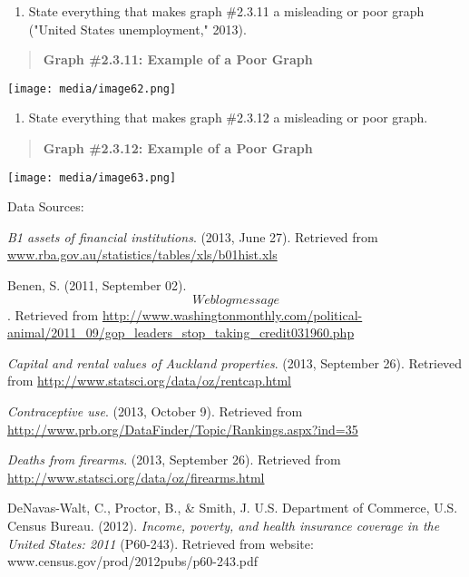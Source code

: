 \documentclass[]{book}
\providecommand{\tightlist}{%
  \setlength{\itemsep}{0pt}\setlength{\parskip}{0pt}}
\begin{document}
\begin{enumerate}
\def\labelenumi{\arabic{enumi}.}
\setcounter{enumi}{12}
\tightlist
\item
  State everything that makes graph \#2.3.11 a misleading or poor
  graph ("United States unemployment," 2013).
\end{enumerate}

\begin{quote}
\textbf{Graph \#2.3.11: Example of a Poor Graph}
\end{quote}

\texttt{[image: media/image62.png]}

\begin{enumerate}
\def\labelenumi{\arabic{enumi}.}
\setcounter{enumi}{13}
\tightlist
\item
  State everything that makes graph \#2.3.12 a misleading or poor
  graph.
\end{enumerate}

\begin{quote}
\textbf{Graph \#2.3.12: Example of a Poor Graph}
\end{quote}

\texttt{[image: media/image63.png]}

Data Sources:

\emph{B1 assets of financial institutions}. (2013, June 27). Retrieved from
\href{http://www.rba.gov.au/statistics/tables/xls/b01hist.xls}{www.rba.gov.au/statistics/tables/xls/b01hist.xls}

Benen, S. (2011, September 02). \[Web log message\]. Retrieved from
\url{http://www.washingtonmonthly.com/political-animal/2011_09/gop_leaders_stop_taking_credit031960.php}

\emph{Capital and rental values of Auckland properties}. (2013, September
26). Retrieved from \url{http://www.statsci.org/data/oz/rentcap.html}

\emph{Contraceptive use}. (2013, October 9). Retrieved from
\url{http://www.prb.org/DataFinder/Topic/Rankings.aspx?ind=35}

\emph{Deaths from firearms}. (2013, September 26). Retrieved from
\url{http://www.statsci.org/data/oz/firearms.html}

DeNavas-Walt, C., Proctor, B., \& Smith, J. U.S. Department of Commerce,
U.S. Census Bureau. (2012). \emph{Income, poverty, and health insurance
coverage in the United States: 2011} (P60-243). Retrieved from website:
www.census.gov/prod/2012pubs/p60-243.pdf‎
\end{document}
